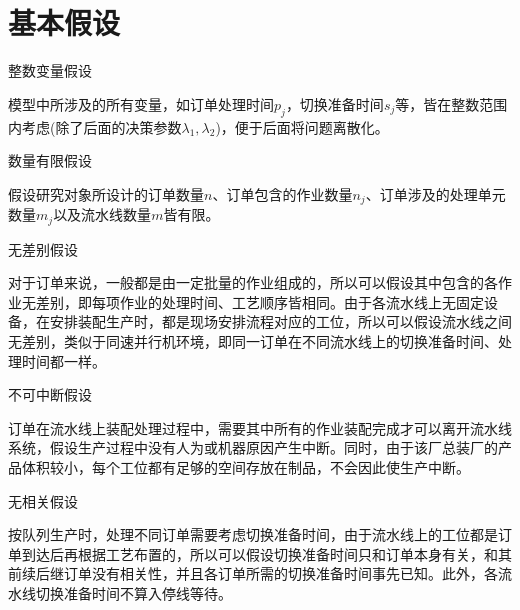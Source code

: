 \section{基本假设}
\begin{compactenum}
\item 整数变量假设

模型中所涉及的所有变量，如订单处理时间$p_j$，切换准备时间$s_j$等，皆在整数范围内考虑(除了后面的决策参数$\lambda_1, \lambda_2$)，便于后面将问题离散化。
\item 数量有限假设

假设研究对象所设计的订单数量$n$、订单包含的作业数量$n_j$、订单涉及的处理单元数量$m_j$以及流水线数量$m$皆有限。
\item 无差别假设

对于订单来说，一般都是由一定批量的作业组成的，所以可以假设其中包含的各作业无差别，即每项作业的处理时间、工艺顺序皆相同。由于各流水线上无固定设备，在安排装配生产时，都是现场安排流程对应的工位，所以可以假设流水线之间无差别，类似于同速并行机环境，即同一订单在不同流水线上的切换准备时间、处理时间都一样。
\item 不可中断假设

订单在流水线上装配处理过程中，需要其中所有的作业装配完成才可以离开流水线系统，假设生产过程中没有人为或机器原因产生中断。同时，由于该厂总装厂的产品体积较小，每个工位都有足够的空间存放在制品，不会因此使生产中断。
\item 无相关假设
\end{compactenum}

按队列生产时，处理不同订单需要考虑切换准备时间，由于流水线上的工位都是订单到达后再根据工艺布置的，所以可以假设切换准备时间只和订单本身有关，和其前续后继订单没有相关性，并且各订单所需的切换准备时间事先已知。此外，各流水线切换准备时间不算入停线等待。

